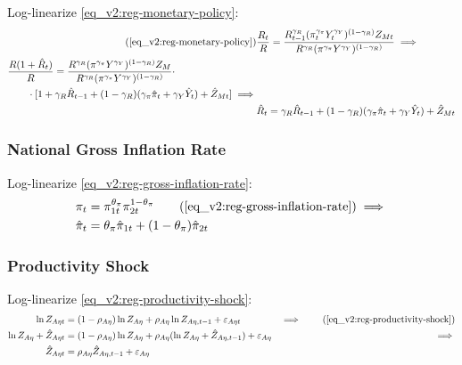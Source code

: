 \documentclass[../thesis.tex]{subfiles}
\begin{document}
Log-linearize \ref{eq_v2:reg-monetary-policy}:
\begin{align}
	\tag{\ref{eq_v2:reg-monetary-policy}}
	& \frac{R_{t}}{R} = \frac{R_{t-1}^{\gamma_{R}} (\pi_t^{\gamma_{\pi}} Y_{t}^{\gamma_{Y}})^{(1-\gamma_{R})} Z_{Mt}}{R^{\gamma_{R}} (\pi^{\gamma_{\pi}} Y^{\gamma_{Y}})^{(1-\gamma_{R})}} \implies \\
	\begin{split}
		& \frac{R(1+ \hat{R}_t)}{R} = \frac{ R^{\gamma_{R}} (\pi^{\gamma_{\pi}} Y^{\gamma_{Y}})^{(1-\gamma_{R})} Z_{M}}{R^{\gamma_{R}} (\pi^{\gamma_{\pi}} Y^{\gamma_{Y}})^{(1-\gamma_{R})}} \cdot \\
		& \qquad \cdot [1+ \gamma_{R} \hat{R}_{t-1} + (1-\gamma_{R})(\gamma_{\pi} \hat{\pi}_t + \gamma_{Y} \hat{Y}_t) + \hat{Z}_{Mt}] \implies
	\end{split} \nonumber \\
	& \hat{R}_t = \gamma_{R} \hat{R}_{t-1} + (1-\gamma_{R})(\gamma_{\pi} \hat{\pi}_t + \gamma_{Y} \hat{Y}_t) + \hat{Z}_{Mt} \label{eq_v2:reg-ll-monetary-policy}
\end{align}


\subsubsection*{National Gross Inflation Rate}

Log-linearize \ref{eq_v2:reg-gross-inflation-rate}:
\begin{align}
	\pi_{t} &= \pi_{1t}^{\theta_{\pi}} \pi_{2t}^{1 - \theta_{\pi}} \tag{\ref{eq_v2:reg-gross-inflation-rate}} \implies \nonumber \\
	\hat{\pi}_{t} &= \theta_{\pi} \hat{\pi}_{1t} + (1 - \theta_{\pi}) \hat{\pi}_{2t} \label{eq_v2:reg-gross-inflation-rate-ll}
\end{align}


\subsubsection*{Productivity Shock}

Log-linearize \ref{eq_v2:reg-productivity-shock}:
\begin{alignat}{2}
	\ln{Z_{A\eta t}} &= (1-\rho_{A\eta})\ln{Z_{A\eta}} + \rho_{A\eta}\ln{Z_{A\eta,t-1}} + \varepsilon_{A\eta t} &\implies \tag{\ref{eq_v2:reg-productivity-shock}} \\
	\ln{Z_{A\eta}} + \hat{Z}_{A\eta t} &= (1-\rho_{A\eta}) \ln{Z_{A\eta}} + \rho_{A\eta} (\ln{Z_{A\eta}} + \hat{Z}_{A\eta, t-1}) + \varepsilon_{A\eta} &\implies \nonumber \\
	\hat{Z}_{A\eta t} &= \rho_{A\eta} \hat{Z}_{A\eta, t-1} + \varepsilon_{A\eta} \label{eq_v2:reg-ll-productivity-shock}
\end{alignat}
\end{document}
